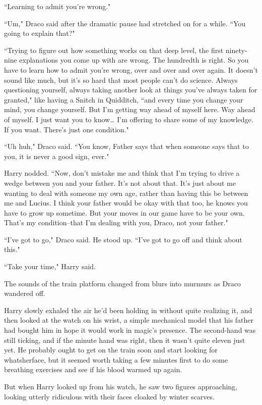 ``Learning to admit you're wrong."

``Um," Draco said after the dramatic pause had stretched on for a while. ``You going to explain that?"

``Trying to figure out how something works on that deep level, the first ninety-nine explanations you come up with are wrong. The hundredth is right. So you have to learn how to admit you're wrong, over and over and over again. It doesn't sound like much, but it's so hard that most people can't do science. Always questioning yourself, always taking another look at things you've always taken for granted," like having a Snitch in Quidditch, ``and every time you change your mind, you change yourself. But I'm getting way ahead of myself here. Way ahead of myself. I just want you to know{\ldots} I'm offering to share some of my knowledge. If you want. There's just one condition."

``Uh huh," Draco said. ``You know, Father says that when someone says that to you, it is never a good sign, ever."

Harry nodded. ``Now, don't mistake me and think that I'm trying to drive a wedge between you and your father. It's not about that. It's just about me wanting to deal with someone my own age, rather than having this be between me and Lucius. I think your father would be okay with that too, he knows you have to grow up sometime. But your moves in our game have to be your own. That's my condition\---that I'm dealing with you, Draco, not your father."

``I've got to go," Draco said. He stood up. ``I've got to go off and think about this."

``Take your time," Harry said.

The sounds of the train platform changed from blurs into murmurs as Draco wandered off.

Harry slowly exhaled the air he'd been holding in without quite realizing it, and then looked at the watch on his wrist, a simple mechanical model that his father had bought him in hope it would work in magic's presence. The second-hand was still ticking, and if the minute hand was right, then it wasn't quite eleven just yet. He probably ought to get on the train soon and start looking for whatsherface, but it seemed worth taking a few minutes first to do some breathing exercises and see if his blood warmed up again.

But when Harry looked up from his watch, he saw two figures approaching, looking utterly ridiculous with their faces cloaked by winter scarves.

